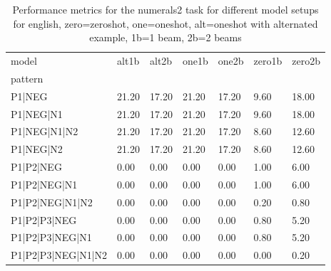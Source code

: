 \begin{table}[h]
\begin{tabular}{l|llllll}
\toprule
model & alt1b & alt2b & one1b & one2b & zero1b & zero2b \\
pattern &  &  &  &  &  &  \\
\midrule
P1|NEG & 21.20 & 17.20 & 21.20 & 17.20 & 9.60 & 18.00 \\
P1|NEG|N1 & 21.20 & 17.20 & 21.20 & 17.20 & 9.60 & 18.00 \\
P1|NEG|N1|N2 & 21.20 & 17.20 & 21.20 & 17.20 & 8.60 & 12.60 \\
P1|NEG|N2 & 21.20 & 17.20 & 21.20 & 17.20 & 8.60 & 12.60 \\
P1|P2|NEG & 0.00 & 0.00 & 0.00 & 0.00 & 1.00 & 6.00 \\
P1|P2|NEG|N1 & 0.00 & 0.00 & 0.00 & 0.00 & 1.00 & 6.00 \\
P1|P2|NEG|N1|N2 & 0.00 & 0.00 & 0.00 & 0.00 & 0.20 & 0.80 \\
P1|P2|P3|NEG & 0.00 & 0.00 & 0.00 & 0.00 & 0.80 & 5.20 \\
P1|P2|P3|NEG|N1 & 0.00 & 0.00 & 0.00 & 0.00 & 0.80 & 5.20 \\
P1|P2|P3|NEG|N1|N2 & 0.00 & 0.00 & 0.00 & 0.00 & 0.00 & 0.20 \\
\bottomrule
\end{tabular}
\caption{Performance metrics for the numerals2 task for different model setups for english, zero=zeroshot, one=oneshot, alt=oneshot with alternated example, 1b=1 beam, 2b=2 beams}
\label{tab:en_numerals2_performance}
\end{table}

